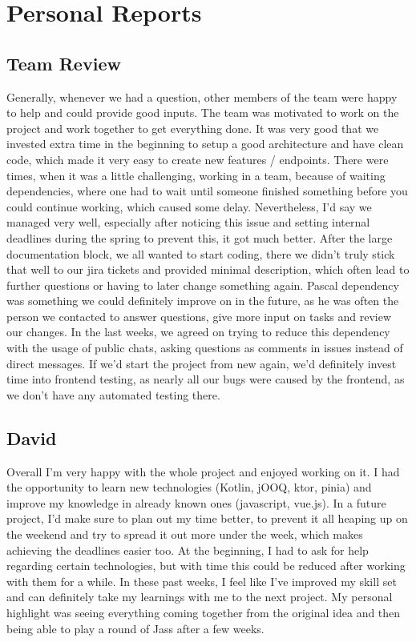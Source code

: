 \chapter{Personal Reports}

\section{Team Review}
Generally, whenever we had a question, other members of the team were happy to help and could provide good inputs.
The team was motivated to work on the project and work together to get everything done.
It was very good that we invested extra time in the beginning to setup a good architecture and have clean code, which made it very easy to create new features / endpoints.
There were times, when it was a little challenging, working in a team, because of waiting dependencies, where one had to wait until someone finished something before you could continue working, which caused some delay.
Nevertheless, I'd say we managed very well, especially after noticing this issue and setting internal deadlines during the spring to prevent this, it got much better.
After the large documentation block, we all wanted to start coding, there we didn't truly stick that well to our jira tickets and provided minimal description, which often lead to further questions or having to later change something again.
Pascal dependency was something we could definitely improve on in the future, as he was often the person we contacted to answer questions, give more input on tasks and review our changes.
In the last weeks, we agreed on trying to reduce this dependency with the usage of public chats, asking questions as comments in issues instead of direct messages.
If we'd start the project from new again, we'd definitely invest time into frontend testing, as nearly all our bugs were caused by the frontend, as we don't have any automated testing there.

\section{David}
Overall I'm very happy with the whole project and enjoyed working on it.
I had the opportunity to learn new technologies (Kotlin, jOOQ, ktor, pinia) and improve my knowledge in already known ones (javascript, vue.js).
In a future project, I'd make sure to plan out my time better, to prevent it all heaping up on the weekend and try to spread it out more under the week, which makes achieving the deadlines easier too.
At the beginning, I had to ask for help regarding certain technologies, but with time this could be reduced after working with them for a while.
In these past weeks, I feel like I've improved my skill set and can definitely take my learnings with me to the next project.
My personal highlight was seeing everything coming together from the original idea and then being able to play a round of Jass after a few weeks.

